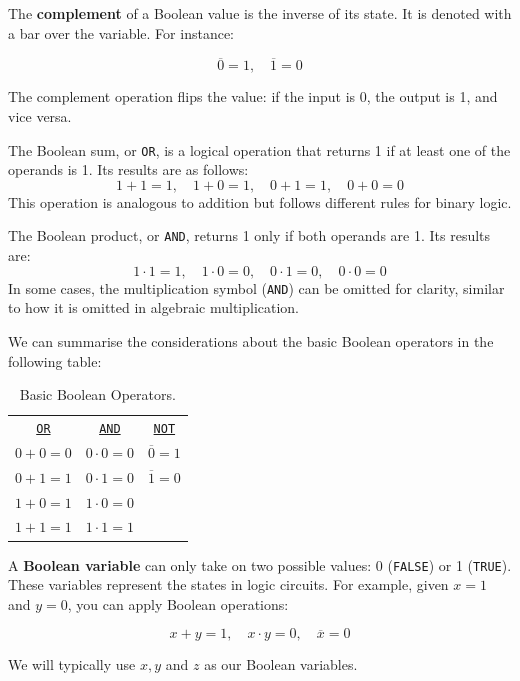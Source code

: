 The \textbf{complement} of a Boolean value is the inverse of its state. It is denoted with a bar over the variable. For instance:

\[
\overline{0} = 1, \quad \overline{1} = 0
\]

The complement operation flips the value: if the input is 0, the output is 1, and vice versa.

The Boolean sum, or \texttt{OR}, is a logical operation that returns 1 if at least one of the operands is 1. Its results are as follows:
\[
1 + 1 = 1, \quad 1 + 0 = 1, \quad 0 + 1 = 1, \quad 0 + 0 = 0
\]
This operation is analogous to addition but follows different rules for binary logic.

The Boolean product, or \texttt{AND}, returns 1 only if both operands are 1. Its results are:
\[
1 \cdot 1 = 1, \quad 1 \cdot 0 = 0, \quad 0 \cdot 1 = 0, \quad 0 \cdot 0 = 0
\]
In some cases, the multiplication symbol (\texttt{AND}) can be omitted for clarity, similar to how it is omitted in algebraic multiplication.

We can summarise the considerations about the basic Boolean operators in the following table:

\begin{table}[h!]
    \begin{center}
    \begin{tabular}{ccc}
    \underline{\texttt{OR}} & \underline{\texttt{AND}} & \underline{\texttt{NOT}} \\
    $0 + 0 = 0$ & $0 \cdot 0 = 0$ & $\overline{0} = 1$ \\
    $0 + 1 = 1$ & $0 \cdot 1 = 0$ & $\overline{1} = 0$ \\
    $1 + 0 = 1$ & $1 \cdot 0 = 0$ & \\
    $1 + 1 = 1$ & $1 \cdot 1 = 1$ & \\
    \end{tabular}
    \end{center}
    \caption{Basic Boolean Operators.}
    \label{tab:basicops}
\end{table}


\begin{remark} A \textbf{Boolean variable} can only take on two possible values: 0 (\texttt{FALSE}) or 1 (\texttt{TRUE}). These variables represent the states in logic circuits. For example, given $x = 1$ and $y = 0$, you can apply Boolean operations:

\[
x + y = 1, \quad x \cdot y = 0, \quad \overline{x} = 0
\]

We will typically use $x, y$ and $z$ as our Boolean variables.

\end{remark}

